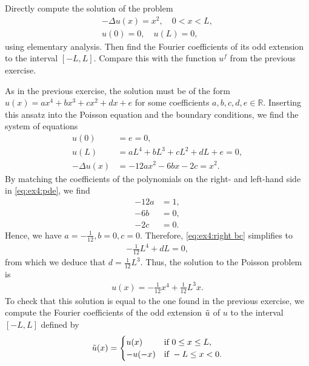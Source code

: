 \documentclass[11pt]{article}
\begin{document}
\begin{exercise}
    Directly compute the solution of the problem
    \begin{gather*}
        - \Delta u(x) = x^2, \quad 0 < x < L,
        \\
        u(0) = 0, \quad u(L) = 0,
    \end{gather*}
    using elementary analysis. Then find the Fourier coefficients of its odd extension to the interval $[-L, L]$. Compare this with the function $u^f$ from the previous exercise.
\end{exercise}
\begin{solution}
As in the previous exercise, the solution must be of the form $u(x) = ax^4 + bx^3 + cx^2 + dx + e$ for some coefficients $a,b,c,d,e \in \mathbb R$.
Inserting this ansatz into the Poisson equation and the boundary conditions, we find the system of equations
\begin{align}
    u(0) &= e = 0, \label{eq:ex4:left bc}\\
    u(L) &= a L^4 + b L^3 + c L^2 + d L + e = 0, \label{eq:ex4:right bc}\\
    - \Delta u(x) &= - 12 a x^2 - 6 b x - 2 c = x^2. \label{eq:ex4:pde}
\end{align}
By matching the coefficients of the polynomials on the right- and left-hand side in \eqref{eq:ex4:pde}, we find
\begin{align*}
    - 12 a &= 1,\\
    - 6 b &= 0,\\
    - 2 c &= 0.
\end{align*}
Hence, we have $a = -\frac{1}{12}, b = 0, c = 0$. Therefore, \eqref{eq:ex4:right bc} simplifies to
\begin{align*}
    -\frac{1}{12} L^4 + dL = 0,
\end{align*}
from which we deduce that $d = \frac{1}{12} L^3$. Thus, the solution to the Poisson problem is
\begin{align*}
    u(x) = -\frac{1}{12} x^4 + \frac{1}{12} L^3 x.
\end{align*}
To check that this solution is equal to the one found in the previous exercise, we compute the Fourier coefficients of the odd extension $\Tilde u$ of $u$ to the interval $[-L,L]$ defined by
\begin{align*}
    \Tilde u(x) = \begin{cases}
        u(x) & \text{if } 0 \leq x \leq L,\\
        -u(-x) & \text{if } -L \leq x < 0.
    \end{cases}

\end{align*}
\end{solution}
\end{document}
